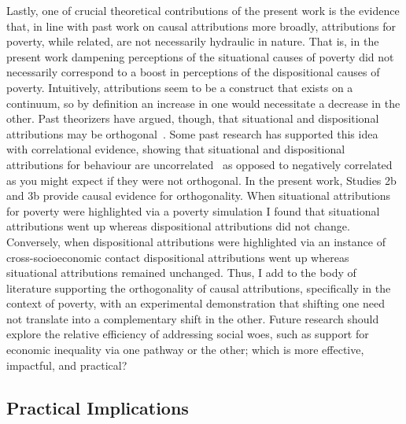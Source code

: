 \documentclass{sfuthesis}
\begin{document}
Lastly, one of crucial theoretical contributions of the present work is the evidence that, in line with past work on causal attributions more broadly, attributions for poverty, while related, are not necessarily hydraulic in nature. That is, in the present work dampening perceptions of the situational causes of poverty did not necessarily correspond to a boost in perceptions of the dispositional causes of poverty. Intuitively, attributions seem to be a construct that exists on a continuum, so by definition an increase in one would necessitate a decrease in the other. Past theorizers have argued, though, that situational and dispositional attributions may be orthogonal~\cite{kluegel86}. Some past research has supported this idea with correlational evidence, showing that situational and dispositional attributions for behaviour are uncorrelated~\cite{taylor76, miller81} as opposed to negatively correlated as you might expect if they were not orthogonal. In the present work, Studies 2b and 3b provide causal evidence for orthogonality. When situational attributions for poverty were highlighted via a poverty simulation I found that situational attributions went up whereas dispositional attributions did not change. Conversely, when dispositional attributions were highlighted via an instance of cross-socioeconomic contact dispositional attributions went up whereas situational attributions remained unchanged. Thus, I add to the body of literature supporting the orthogonality of causal attributions, specifically in the context of poverty, with an experimental demonstration that shifting one need not translate into a complementary shift in the other. Future research should explore the relative efficiency of addressing social woes, such as support for economic inequality via one pathway or the other; which is more effective, impactful, and practical?

\subsection{Practical Implications}
\end{document}
